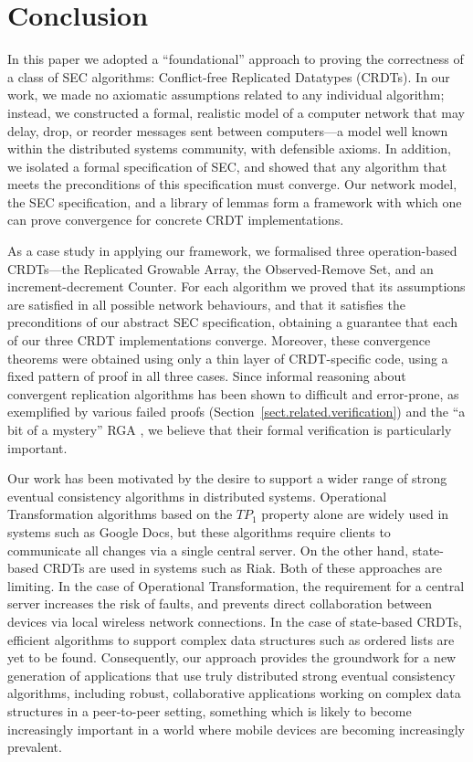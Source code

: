 \documentclass[acmlarge,review,anonymous]{acmart}
\begin{document}
\section{Conclusion}
\label{sect.conclusion}

In this paper we adopted a ``foundational'' approach to proving the correctness of a class of SEC algorithms: Conflict-free Replicated Datatypes (CRDTs).
In our work, we made no axiomatic assumptions related to any individual algorithm; instead, we constructed a formal, realistic model of a computer network that may delay, drop, or reorder messages sent between computers---a model well known within the distributed systems community, with defensible axioms.
In addition, we isolated a formal specification of SEC, and showed that any algorithm that meets the preconditions of this specification must converge.
Our network model, the SEC specification, and a library of lemmas form a framework with which one can prove convergence for concrete CRDT implementations.

As a case study in applying our framework, we formalised three operation-based CRDTs---the Replicated Growable Array, the Observed-Remove Set, and an increment-decrement Counter.
For each algorithm we proved that its assumptions are satisfied in all possible network behaviours, and that it satisfies the preconditions of our abstract SEC specification, obtaining a guarantee that each of our three CRDT implementations converge.
Moreover, these convergence theorems were obtained using only a thin layer of CRDT-specific code, using a fixed pattern of proof in all three cases.
Since informal reasoning about convergent replication algorithms has been shown to difficult and error-prone, as exemplified by various failed proofs (Section~\ref{sect.related.verification}) and the ``a bit of a mystery'' RGA \cite{Attiya:2016kh}, we believe that their formal verification is particularly important.

Our work has been motivated by the desire to support a wider range of strong eventual consistency algorithms in distributed systems.
Operational Transformation algorithms based on the $\mathit{TP}_1$ property alone are widely used in systems such as Google Docs, but these algorithms require clients to communicate all changes via a single central server.
On the other hand, state-based CRDTs are used in systems such as Riak.
Both of these approaches are limiting.
In the case of Operational Transformation, the requirement for a central server increases the risk of faults, and prevents direct collaboration between devices via local wireless network connections.
In the case of state-based CRDTs, efficient algorithms to support complex data structures such as ordered lists are yet to be found.
Consequently, our approach provides the groundwork for a new generation of applications that use truly distributed strong eventual consistency algorithms, including robust, collaborative applications working on complex data structures in a peer-to-peer setting, something which is likely to become increasingly important in a world where mobile devices are becoming increasingly prevalent.
\end{document}
